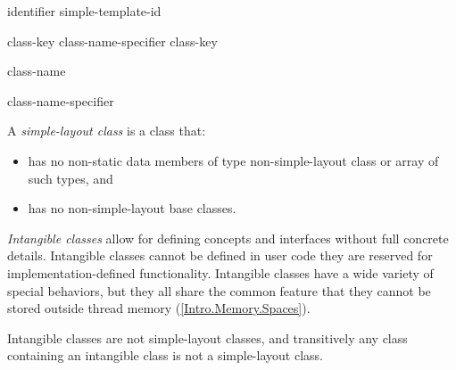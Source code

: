 
\begin{grammar}
  \br
  identifier\br
  simple-template-id\br

  \br
  class-key class-name-specifier \br
  class-key \br

  \br
   class-name\br

  \br
  \terminal{:} class-name-specifier\br

  \br
  \br
\end{grammar}


\p A \textit{simple-layout class} is a class that:
\begin{itemize}
  \item has no non-static data members of type non-simple-layout class or array
  of such types, and
  \item has no non-simple-layout base classes.
\end{itemize}


\p \textit{Intangible classes} allow for defining concepts and interfaces
without full concrete details. Intangible classes cannot be defined in user code
they are reserved for implementation-defined functionality. Intangible classes
have a wide variety of special behaviors, but they all share the common feature
that they cannot be stored outside thread memory (\ref{Intro.Memory.Spaces}).

\p Intangible classes are not simple-layout classes, and transitively any class
containing an intangible class is not a simple-layout class.

